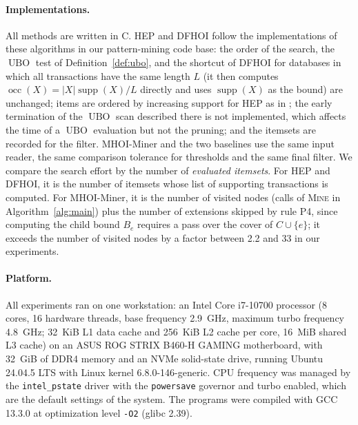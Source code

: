 \documentclass[pdflatex,sn-mathphys,Numbered]{sn-jnl}
\theoremstyle{thmstyleone}
\theoremstyle{thmstyletwo}
\theoremstyle{thmstylethree}
\newcommand{\supp}{\operatorname{supp}}
\newcommand{\occ}{\operatorname{occ}}
\newcommand{\ubo}{\operatorname{UBO}}
\newcommand{\Algo}{MHOI-Miner}
\begin{document}
\paragraph{Implementations.}
All methods are written in C. HEP and DFHOI follow the implementations of these algorithms in our pattern-mining code base: the order of the search, the $\ubo$ test of Definition~\ref{def:ubo}, and the shortcut of DFHOI for databases in which all transactions have the same length $L$ (it then computes $\occ(X) = |X| \supp(X) / L$ directly and uses $\supp(X)$ as the bound) are unchanged; items are ordered by increasing support for HEP as in \cite[Section~3.2.3]{deng2020hoi}; the early termination of the $\ubo$ scan described there is not implemented, which affects the time of a $\ubo$ evaluation but not the pruning; and the itemsets are recorded for the filter. \Algo{} and the two baselines use the same input reader, the same comparison tolerance for thresholds and the same final filter. We compare the search effort by the number of \emph{evaluated itemsets}. For HEP and DFHOI, it is the number of itemsets whose list of supporting transactions is computed. For \Algo{}, it is the number of visited nodes (calls of \textsc{Mine} in Algorithm~\ref{alg:main}) plus the number of extensions skipped by rule P4, since computing the child bound $B_e$ requires a pass over the cover of $C \cup \{e\}$; it exceeds the number of visited nodes by a factor between 2.2 and 33 in our experiments.

\paragraph{Platform.}
All experiments ran on one workstation: an Intel Core i7-10700 processor (8 cores, 16 hardware threads, base frequency 2.9~GHz, maximum turbo frequency 4.8~GHz; 32~KiB L1 data cache and 256~KiB L2 cache per core, 16~MiB shared L3 cache) on an ASUS ROG STRIX B460-H GAMING motherboard, with 32~GiB of DDR4 memory and an NVMe solid-state drive, running Ubuntu 24.04.5 LTS with Linux kernel 6.8.0-146-generic. CPU frequency was managed by the \texttt{intel\_pstate} driver with the \texttt{powersave} governor and turbo enabled, which are the default settings of the system. The programs were compiled with GCC 13.3.0 at optimization level \texttt{-O2} (glibc 2.39).
\end{document}
